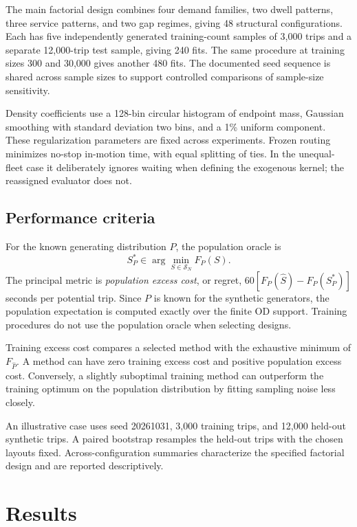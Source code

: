 \documentclass[11pt]{article}
\theoremstyle{remark}\newtheorem{remark}[theorem]{Remark}
\newcommand{\Sset}{\mathcal S_N}
\begin{document}
The main factorial design combines four demand families, two dwell patterns, three service patterns, and two gap regimes, giving 48 structural configurations. Each has five independently generated training-count samples of 3,000 trips and a separate 12,000-trip test sample, giving 240 fits. The same procedure at training sizes 300 and 30,000 gives another 480 fits. The documented seed sequence is shared across sample sizes to support controlled comparisons of sample-size sensitivity.

Density coefficients use a 128-bin circular histogram of endpoint mass, Gaussian smoothing with standard deviation two bins, and a 1\% uniform component. These regularization parameters are fixed across experiments. Frozen routing minimizes no-stop in-motion time, with equal splitting of ties. In the unequal-fleet case it deliberately ignores waiting when defining the exogenous kernel; the reassigned evaluator does not.

\subsection{Performance criteria}
For the known generating distribution $P$, the population oracle is
\begin{equation}
S_P^*\in\arg\min_{S\in\Sset}F_P(S).
\end{equation}
The principal metric is \emph{population excess cost}, or regret,
$60[F_P(\widehat S)-F_P(S_P^*)]$ seconds per potential trip. Since $P$ is known for the synthetic generators, the population expectation is computed exactly over the finite OD support. Training procedures do not use the population oracle when selecting designs.

Training excess cost compares a selected method with the exhaustive minimum of $F_{\widehat P}$. A method can have zero training excess cost and positive population excess cost. Conversely, a slightly suboptimal training method can outperform the training optimum on the population distribution by fitting sampling noise less closely.

An illustrative case uses seed 20261031, 3,000 training trips, and 12,000 held-out synthetic trips. A paired bootstrap resamples the held-out trips with the chosen layouts fixed. Across-configuration summaries characterize the specified factorial design and are reported descriptively.

\section{Results}\label{sec:results}
\end{document}
